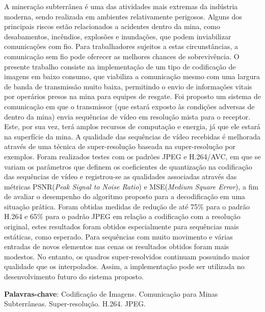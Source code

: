 \begin{resumo}

A mineração subterrânea é uma das atividades mais extremas da indústria moderna, sendo realizada em ambientes relativamente perigosos. Alguns dos principais riscos estão relacionados a acidentes dentro da mina, como desabamentos, incêndios, explosões e inundações, que podem inviabilizar comunicações com fio. Para trabalhadores sujeitos a estas circunstâncias, a  comunicação sem fio pode oferecer as melhores chances de sobrevivência. O presente trabalho consiste na implementação de um tipo de codificação de imagens em baixo consumo, que viabiliza a comunicação mesmo com uma largura de banda de transmissão muito baixa, permitindo o envio de informações vitais por operários presos na mina para equipes de resgate. Foi proposto um sistema de comunicação em que o transmissor (que  estará exposto às condições adversas de dentro da mina) envia sequências de vídeo em resolução mista para o receptor. Este, por sua vez, terá amplos recursos de computação e energia, já que ele estará na superfície da mina. A qualidade das sequências de vídeo recebidas é melhorada através de uma técnica de super-resolução baseada na super-resolução por exemplos. Foram realizados testes com os padrões JPEG e H.264/AVC, em que se variam os parâmetros que definem os coeficientes de quantização na codificação das sequências de vídeo e registrou-se as qualidades associadas  através das métricas PSNR(\textit{Peak Signal to Noise Ratio}) e MSE(\textit{Medium Square Error}), a fim de avaliar o desempenho do algoritmo proposto para a decodificação em uma situação prática. Foram obtidas medidas de redução de até 75\% para o padrão H.264 e 65\% para o padrão JPEG em relação a codificação com a resolução original, estes resultados foram obtidos especialmente para sequências mais estáticas, como esperado. Para sequências com muito movimento e várias entradas de novos elementos nas cenas os resultados obtidos foram mais modestos. No entanto,  os quadros super-resolvidos continuam possuindo maior qualidade que os interpolados. Assim, a implementação pode ser utilizada no desenvolvimento futuro do sistema proposto.

\vspace{\onelineskip}
    
 \noindent
 \textbf{Palavras-chave}: Codificação de Imagens. Comunicação para Minas Subterrâneas. Super-resolução. H.264. JPEG. 
\end{resumo}
